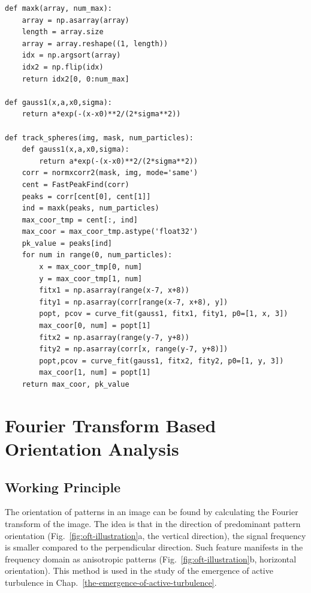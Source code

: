 \begin{verbatim}
def maxk(array, num_max):
    array = np.asarray(array)
    length = array.size
    array = array.reshape((1, length))
    idx = np.argsort(array)
    idx2 = np.flip(idx)
    return idx2[0, 0:num_max]

def gauss1(x,a,x0,sigma):
    return a*exp(-(x-x0)**2/(2*sigma**2))

def track_spheres(img, mask, num_particles):
    def gauss1(x,a,x0,sigma):
        return a*exp(-(x-x0)**2/(2*sigma**2))
    corr = normxcorr2(mask, img, mode='same')
    cent = FastPeakFind(corr)
    peaks = corr[cent[0], cent[1]]
    ind = maxk(peaks, num_particles)
    max_coor_tmp = cent[:, ind]
    max_coor = max_coor_tmp.astype('float32')
    pk_value = peaks[ind]
    for num in range(0, num_particles):
        x = max_coor_tmp[0, num]
        y = max_coor_tmp[1, num]
        fitx1 = np.asarray(range(x-7, x+8))
        fity1 = np.asarray(corr[range(x-7, x+8), y])
        popt, pcov = curve_fit(gauss1, fitx1, fity1, p0=[1, x, 3])
        max_coor[0, num] = popt[1]
        fitx2 = np.asarray(range(y-7, y+8))
        fity2 = np.asarray(corr[x, range(y-7, y+8)])
        popt,pcov = curve_fit(gauss1, fitx2, fity2, p0=[1, y, 3])
        max_coor[1, num] = popt[1]
    return max_coor, pk_value
\end{verbatim}


\section{Fourier Transform Based Orientation Analysis}
\label{sec:A-fourier-transform-based-orientation-analysis}
\subsection{Working Principle}
The orientation of patterns in an image can be found by calculating the Fourier transform of the image. The idea is that in the direction of predominant pattern orientation (Fig.~\ref{fig:oft-illustration}a, the vertical direction), the signal frequency is smaller compared to the perpendicular direction. Such feature manifests in the frequency domain as anisotropic patterns (Fig.~\ref{fig:oft-illustration}b, horizontal orientation). This method is used in the study of the emergence of active turbulence in Chap.~\ref{the-emergence-of-active-turbulence}.

